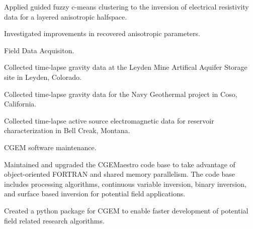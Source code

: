 \begin{cventries}
{\begin{cvparagraph}
      \vspace{7pt}
      \end{cvparagraph}
      \begin{cvitems}
        \item {Applied guided fuzzy c-means clustering to the inversion of electrical resistivity data for a layered anisotropic halfspace.}
        \item{Investigated improvements in recovered anisotropic parameters.}
        \vspace{10pt}
      \end{cvitems}
      \begin{cvparagraph}
      \vspace{7pt}
      Field Data Acquisiton.
      \vspace{7pt}
      \end{cvparagraph}
      \begin{cvitems}
        \item {Collected time-lapse gravity data at the Leyden Mine Artifical Aquifer Storage site in Leyden, Colorado.}
        \item{Collected time-lapse gravity data for the Navy Geothermal project in Coso, California.}
        \item {Collected time-lapse active source electromagnetic data for reservoir characterization in Bell Creak, Montana.}
        \vspace{10pt}
      \end{cvitems}
      \begin{cvparagraph}
      \vspace{7pt}
      CGEM software maintenance.
      \vspace{7pt}
      \end{cvparagraph}
      \begin{cvitems}
        \item {Maintained and upgraded the CGEMaestro code base to take advantage of object-oriented FORTRAN and shared memory parallelism. The code base includes processing algorithms, continuous variable inversion, binary inversion, and surface based inversion for potential field applications.}
        \item {Created a python package for CGEM to enable faster development of potential field related research algorithms.}
        \vspace{10pt}
      \end{cvitems}
      \begin{cvparagraph}
      \vspace{7pt}

\end{cvparagraph}}
\end{cventries}
